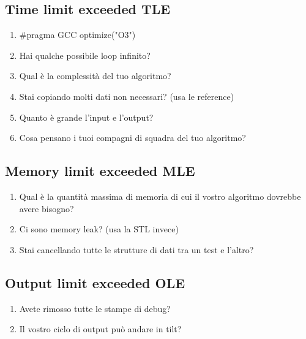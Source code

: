 \subsection{Time limit exceeded TLE}
\begin{enumerate}
    \item $\#$pragma GCC optimize("O3")
    \item Hai qualche possibile loop infinito?
    \item Qual è la complessità del tuo algoritmo?
    \item Stai copiando molti dati non necessari? (usa le reference)
    \item Quanto è grande l'input e l'output?
    \item Cosa pensano i tuoi compagni di squadra del tuo algoritmo?
\end{enumerate}

\subsection{Memory limit exceeded MLE}
\begin{enumerate}
    \item Qual è la quantità massima di memoria di cui il vostro algoritmo dovrebbe avere bisogno?
    \item Ci sono memory leak? (usa la STL invece)
    \item Stai cancellando tutte le strutture di dati tra un test e l'altro?
\end{enumerate}

\subsection{Output limit exceeded OLE}
\begin{enumerate}
    \item Avete rimosso tutte le stampe di debug?
    \item Il vostro ciclo di output può andare in tilt?
\end{enumerate}
